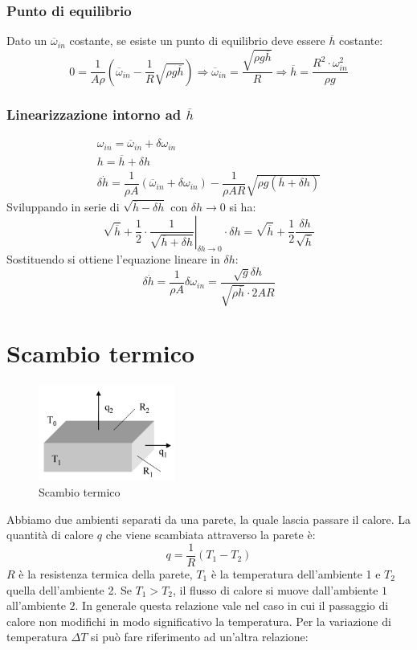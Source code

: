 \documentclass[a4paper]{report}
\begin{document}
\subsubsection{Punto di equilibrio}
Dato un $\overline{\omega}_{in}$ costante, se esiste un punto di
equilibrio deve essere $\overline{h}$ costante:
\[
  0 = \dfrac{1}{A \rho} \left( \overline{\omega}_{in} -
  \dfrac{1}{R}\sqrt{\rho g \overline{h}} \right) \Rightarrow
  \overline{\omega}_{in} = \dfrac{\sqrt{\rho g \overline{h}}}{R}
  \Rightarrow \overline{h} = \dfrac{R^2 \cdot \omega_{in}^2}{\rho g}
\]
\subsubsection{Linearizzazione intorno ad $\overline{h}$}
\[
  \begin{array}{l}
    \omega_{in} = \overline{\omega}_{in} + \delta \omega_{in}\\
    h = \overline{h} + \delta h\\
    \delta \dot{h} = \dfrac{1}{\rho A} (\overline{\omega}_{in} + \delta
    \omega_{in}) - \dfrac{1}{\rho AR}\sqrt{\rho g (\overline{h} +
      \delta h)}
  \end{array}
\]
Sviluppando in serie di $\sqrt{\overline{h} - \delta h}$ con $\delta h
\rightarrow 0$ si ha:
\[
  \sqrt{\overline{h}} + \left . \frac{1}{2} \cdot \dfrac{1}{\sqrt{\overline{h}
      + \delta h}}\right|_{\delta h \rightarrow 0} \cdot \delta h =
  \sqrt{\overline{h}} + \frac{1}{2} \dfrac{\delta h}{\sqrt{\overline{h}}}
\]
Sostituendo si ottiene l'equazione lineare in $\delta h$:
\[
  \delta \dot{h} = \dfrac{1}{\rho A} \delta \omega_{in} =
  \dfrac{\sqrt{g} \delta h}{\sqrt{\rho \overline{h}} \cdot 2 AR}
\]

\section{Scambio termico}
\begin{figure}[!h]
  \centering
  \includegraphics[width=0.4\textwidth]{./images/scambiotermico01.png}
  \caption{Scambio termico\label{fig:scambiotermico01}}
\end{figure}
Abbiamo due ambienti separati da una parete, la quale lascia passare
il calore. La quantit\`a di calore $q$ che viene scambiata attraverso
la parete \`e:
\begin{equation}
  q = \frac{1}{R} (T_1 - T_2)
\end{equation}
$R$ \`e la resistenza termica della parete, $T_1$ \`e la temperatura
dell'ambiente 1 e $T_2$ quella dell'ambiente 2. Se $T_1 > T_2$, il flusso
di calore si muove dall'ambiente $1$ all'ambiente $2$. In generale
questa relazione vale nel caso in cui il passaggio di calore non
modifichi in modo significativo la temperatura. Per la variazione di
temperatura $\Delta T$ si pu\`o fare riferimento ad un'altra relazione:
\end{document}
